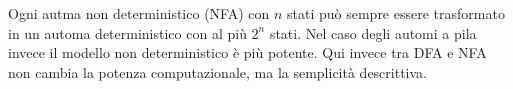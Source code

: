 \documentclass[12pt]{article}
\begin{document}
Ogni autma non deterministico (NFA) con $n$ stati può sempre essere trasformato in un automa deterministico con al più $2^n$ stati.
Nel caso degli automi a pila invece il modello non deterministico è più potente.
Qui invece tra DFA e NFA non cambia la potenza computazionale, ma la semplicità descrittiva.
\end{document}
